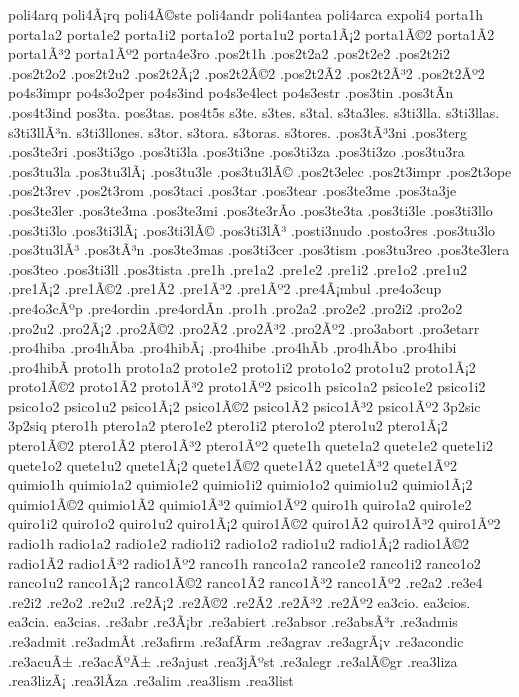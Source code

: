{poli4arq
poli4Ã¡rq
poli4Ã©ste
poli4andr
poli4antea
poli4arca
expoli4
porta1h
porta1a2 porta1e2 porta1i2 porta1o2 porta1u2
porta1Ã¡2 porta1Ã©2 porta1Ã­2 porta1Ã³2 porta1Ãº2
porta4e3ro
.pos2t1h
.pos2t2a2 .pos2t2e2 .pos2t2i2 .pos2t2o2 .pos2t2u2
.pos2t2Ã¡2 .pos2t2Ã©2 .pos2t2Ã­2 .pos2t2Ã³2 .pos2t2Ãº2
po4s3impr
po4s3o2per
po4s3ind
po4s3e4lect
po4s3estr
.pos3tin
.pos3tÃ­n
.pos4t3ind
pos3ta.
pos3tas.
pos4t5s
s3te.
s3tes.
s3tal.
s3ta3les.
s3ti3lla.
s3ti3llas.
s3ti3llÃ³n.
s3ti3llones.
s3tor.
s3tora.
s3toras.
s3tores.
.pos3tÃ³3ni
.pos3terg
.pos3te3ri
.pos3ti3go
.pos3ti3la
.pos3ti3ne
.pos3ti3za
.pos3ti3zo
.pos3tu3ra
.pos3tu3la
.pos3tu3lÃ¡
.pos3tu3le
.pos3tu3lÃ©
.pos2t3elec
.pos2t3impr
.pos2t3ope
.pos2t3rev
.pos2t3rom
.pos3taci
.pos3tar
.pos3tear
.pos3te3me
.pos3ta3je
.pos3te3ler
.pos3te3ma
.pos3te3mi
.pos3te3rÃ­o
.pos3te3ta
.pos3ti3le
.pos3ti3llo
.pos3ti3lo
.pos3ti3lÃ¡
.pos3ti3lÃ©
.pos3ti3lÃ³
.posti3nudo
.posto3res
.pos3tu3lo
.pos3tu3lÃ³
.pos3tÃ³n
.pos3te3mas
.pos3ti3cer
.pos3tism
.pos3tu3reo
.pos3te3lera
.pos3teo
.pos3ti3ll
.pos3tista
.pre1h
.pre1a2 .pre1e2 .pre1i2 .pre1o2 .pre1u2
.pre1Ã¡2 .pre1Ã©2 .pre1Ã­2 .pre1Ã³2 .pre1Ãº2
.pre4Ã¡mbul
.pre4o3cup
.pre4o3cÃºp
.pre4ordin
.pre4ordÃ­n
.pro1h
.pro2a2 .pro2e2 .pro2i2 .pro2o2 .pro2u2
.pro2Ã¡2 .pro2Ã©2 .pro2Ã­2 .pro2Ã³2 .pro2Ãº2
.pro3abort
.pro3etarr
.pro4hiba
.pro4hÃ­ba
.pro4hibÃ¡
.pro4hibe
.pro4hÃ­b
.pro4hÃ­bo
.pro4hibi
.pro4hibÃ­
proto1h
proto1a2 proto1e2 proto1i2 proto1o2 proto1u2
proto1Ã¡2 proto1Ã©2 proto1Ã­2 proto1Ã³2 proto1Ãº2
psico1h
psico1a2 psico1e2 psico1i2 psico1o2 psico1u2
psico1Ã¡2 psico1Ã©2 psico1Ã­2 psico1Ã³2 psico1Ãº2
3p2sic
3p2siq
ptero1h
ptero1a2 ptero1e2 ptero1i2 ptero1o2 ptero1u2
ptero1Ã¡2 ptero1Ã©2 ptero1Ã­2 ptero1Ã³2 ptero1Ãº2
quete1h
quete1a2 quete1e2 quete1i2 quete1o2 quete1u2
quete1Ã¡2 quete1Ã©2 quete1Ã­2 quete1Ã³2 quete1Ãº2
quimio1h
quimio1a2 quimio1e2 quimio1i2 quimio1o2 quimio1u2
quimio1Ã¡2 quimio1Ã©2 quimio1Ã­2 quimio1Ã³2 quimio1Ãº2
quiro1h
quiro1a2 quiro1e2 quiro1i2 quiro1o2 quiro1u2
quiro1Ã¡2 quiro1Ã©2 quiro1Ã­2 quiro1Ã³2 quiro1Ãº2
radio1h
radio1a2 radio1e2 radio1i2 radio1o2 radio1u2
radio1Ã¡2 radio1Ã©2 radio1Ã­2 radio1Ã³2 radio1Ãº2
ranco1h
ranco1a2 ranco1e2 ranco1i2 ranco1o2 ranco1u2
ranco1Ã¡2 ranco1Ã©2 ranco1Ã­2 ranco1Ã³2 ranco1Ãº2
.re2a2
.re3e4
.re2i2
.re2o2
.re2u2
.re2Ã¡2
.re2Ã©2
.re2Ã­2
.re2Ã³2
.re2Ãº2
ea3cio.
ea3cios.
ea3cia.
ea3cias.
.re3abr
.re3Ã¡br
.re3abiert
.re3absor
.re3absÃ³r
.re3admis
.re3admit
.re3admÃ­t
.re3afirm
.re3afÃ­rm
.re3agrav
.re3agrÃ¡v
.re3acondic
.re3acuÃ±
.re3acÃºÃ±
.re3ajust
.rea3jÃºst
.re3alegr
.re3alÃ©gr
.rea3liza
.rea3lizÃ¡
.rea3lÃ­za
.re3alim
.rea3lism
.rea3list
}
